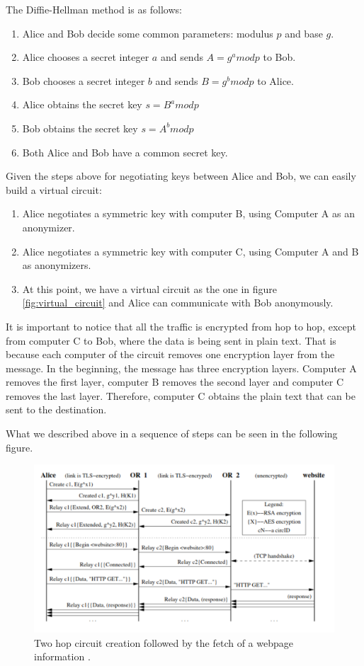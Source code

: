 \documentclass[11pt, a4paper,twoside]{tesi_upf}
\begin{document}
The Diffie-Hellman method is as follows:
\begin{enumerate}
    \item Alice and Bob decide some common parameters: modulus $p$ and base $g$.
    \item Alice chooses a secret integer $a$ and sends $A=g^a mod p$ to Bob.
    \item Bob chooses a secret integer $b$ and sends $B=g^b mod p$ to Alice.
    \item Alice obtains the secret key $s=B^a mod p$
    \item Bob obtains the secret key $s=A^b mod p$
    \item Both Alice and Bob have a common secret key.
\end{enumerate}
\newpage
Given the steps above for negotiating keys between Alice and Bob, we can easily build a virtual circuit:
\begin{enumerate}
    \item Alice negotiates a symmetric key with computer B, using Computer A as an anonymizer.
    \item Alice negotiates a symmetric key with computer C, using Computer A and B as anonymizers.
    \item At this point, we have a virtual circuit as the one in figure \ref{fig:virtual_circuit} and Alice can communicate with Bob anonymously.
\end{enumerate}

It is important to notice that all the traffic is encrypted from hop to hop, except from computer C to Bob, where the data is being sent in plain text. That is because each computer of the circuit removes one encryption layer from the message. In the beginning, the message has three encryption layers. Computer A removes the first layer, computer B removes the second layer and computer C removes the last layer. Therefore, computer C obtains the plain text that can be sent to the destination.

What we described above in a sequence of steps can be seen in the following figure.

\begin{figure}[h]
    \centering
    \includegraphics[scale=0.4]{images/build_two_hops_circuit.png}
    \caption{Two hop circuit creation followed by the fetch of a webpage information
    \cite{tor-whitepaper}.}
    \label{fig:two_hop_circuit}
\end{figure}
\end{document}
